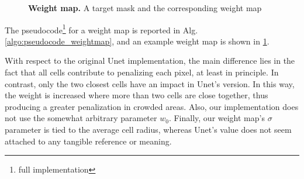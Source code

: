 %
\begin{figure}
    \centering
    \caption{\textbf{Weight map.} A target mask and the corresponding weight map}
    \label{fig:weight_map_example}
\end{figure}
%
The pseudocode\footnote{full implementation \githubweights} for a weight map is reported in Alg. \ref{algo:pseudocode_weightmap}, and an example weight map is shown in \cref{fig:weight_map_example}.

With respect to the original Unet implementation, the main difference lies in the fact that all cells contribute to penalizing each pixel, at least in principle. In contrast, only the two closest cells have an impact in Unet's version.
In this way, the weight is increased where more than two cells are close together, thus producing a greater penalization in crowded areas.
Also, our implementation does not use the somewhat arbitrary parameter $w_0$.
Finally, our weight map's $\sigma$ parameter is tied to the average cell radius, whereas Unet's value does not seem attached to any tangible reference or meaning.

